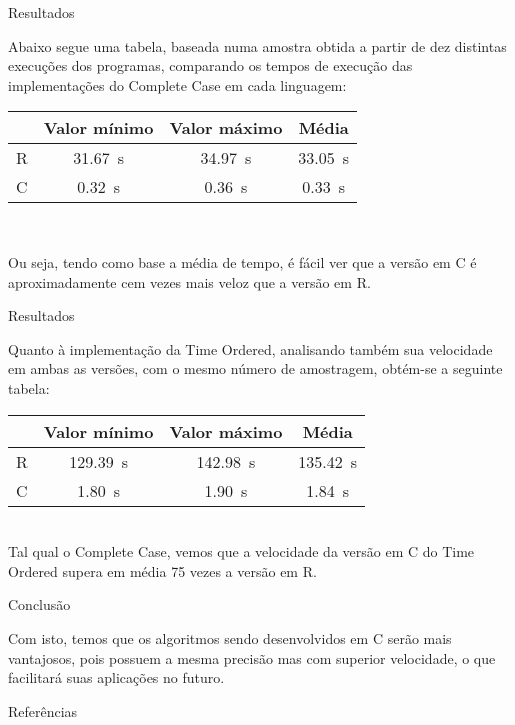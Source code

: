 \documentclass{beamer}
\begin{document}
\begin{frame}{Resultados}
    
Abaixo segue uma tabela, baseada numa amostra obtida a partir de dez distintas execuções dos programas, comparando os tempos de execução das implementações do Complete Case em cada linguagem:
\vspace{0.3cm}

\begin{tabular}{|c|c|c|c|}
     \hline
      & Valor mínimo & Valor máximo & Média\\
      \hline
      R & \SI{31.67}{\second} & \SI{34.97}{\second} & \SI{33.05}{\second}\\
      \hline
      C & \SI{0.32}{\second} & \SI{0.36}{\second} & \SI{0.33}{\second}\\
      \hline
\end{tabular}\\
\vspace{0.3cm}

Ou seja, tendo como base a média de tempo, é fácil ver que a versão em C é aproximadamente cem vezes mais veloz que a versão em R.
    
\end{frame}

\begin{frame}{Resultados}
    
Quanto à implementação da Time Ordered, analisando também sua velocidade em ambas as versões, com o mesmo número de amostragem, obtém-se a seguinte tabela:\\

\vspace{0.3cm}
\begin{tabular}{|c|c|c|c|}
     \hline
      & Valor mínimo & Valor máximo & Média\\
      \hline
      R & \SI{129.39}{\second} & \SI{142.98}{\second} & \SI{135.42}{\second}\\
      \hline
      C & \SI{1.80}{\second} & \SI{1.90}{\second} & \SI{1.84}{\second}\\
      \hline
\end{tabular}\\
\vspace{0.3cm}
Tal qual o Complete Case, vemos que a velocidade da versão em C do Time Ordered supera em média 75 vezes a versão em R.
    
\end{frame}

\begin{frame}{Conclusão}
    
Com isto, temos que os algoritmos sendo desenvolvidos em C serão mais vantajosos, pois possuem a mesma precisão mas com superior velocidade, o que facilitará suas aplicações no futuro.

\end{frame}

\begin{frame}{Referências}
    
    \tiny
\end{frame}
\end{document}
